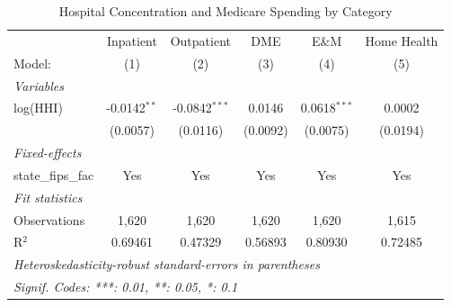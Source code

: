 
\begin{table}[htbp]
   \caption{\label{tab:placebo} Hospital Concentration and Medicare Spending by Category}
   \centering
   \begin{tabular}{lccccc}
      \tabularnewline \midrule \midrule
                         & Inpatient      & Outpatient      & DME      & E\&M           & Home Health \\   
      Model:             & (1)            & (2)             & (3)      & (4)            & (5)\\  
      \midrule
      \emph{Variables}\\
      log(HHI)           & -0.0142$^{**}$ & -0.0842$^{***}$ & 0.0146   & 0.0618$^{***}$ & 0.0002\\   
                         & (0.0057)       & (0.0116)        & (0.0092) & (0.0075)       & (0.0194)\\   
      \midrule
      \emph{Fixed-effects}\\
      state\_fips\_fac   & Yes            & Yes             & Yes      & Yes            & Yes\\  
      \midrule
      \emph{Fit statistics}\\
      Observations       & 1,620          & 1,620           & 1,620    & 1,620          & 1,615\\  
      R$^2$              & 0.69461        & 0.47329         & 0.56893  & 0.80930        & 0.72485\\  
      \midrule \midrule
      \multicolumn{6}{l}{\emph{Heteroskedasticity-robust standard-errors in parentheses}}\\
      \multicolumn{6}{l}{\emph{Signif. Codes: ***: 0.01, **: 0.05, *: 0.1}}\\
   \end{tabular}
\end{table}


